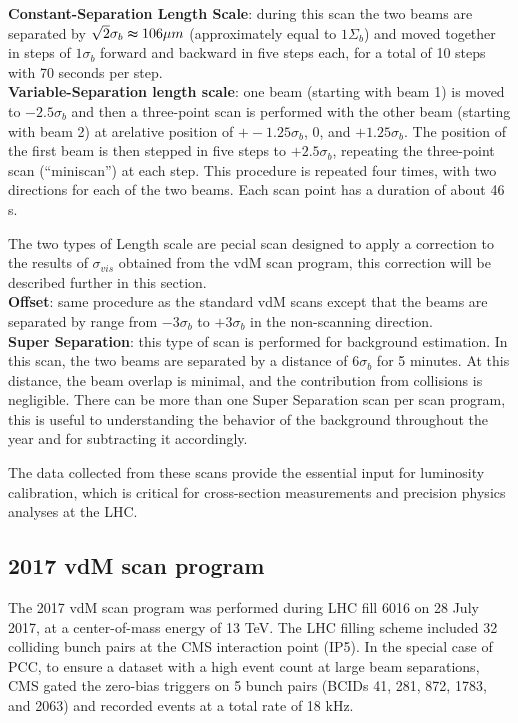 \noindent \textbf{Constant-Separation Length Scale}: during this scan the two beams are separated by $\sqrt{2} \sigma_{b} \thickapprox 106 \mu m$ (approximately equal to $1 \Sigma_{b}$) and moved together in steps of $1\sigma_{b}$ forward and backward in five steps each, for a total of 10 steps with 70 seconds per step.\\

\noindent \textbf{Variable-Separation length scale}: one beam (starting with beam 1) is moved to $-2.5\sigma_{b}$ and then a three-point scan is performed with the other beam (starting with beam 2) at arelative position of $+-1.25\sigma_{b}$, 0, and $+1.25\sigma_{b}$. The position of the first beam is then stepped in five steps to $+2.5\sigma_{b}$, repeating the three-point scan (“miniscan”) at each step. This procedure is repeated four times, with two directions for each of the two beams. Each scan point has a duration of about 46 s.
 
The two types of Length scale are pecial scan designed to apply a correction to the results of  $\sigma_{vis}$ obtained from the vdM scan program, this correction will be described further in this section.\\
 
\noindent \textbf{Offset}: same procedure as the standard vdM scans except that the beams are separated by  range from $-3\sigma_{b}$ to $+3\sigma_{b}$ in the non-scanning direction.\\ 
 
\noindent \textbf{Super Separation}: this type of scan is performed for background estimation. In this scan, the two beams are separated by a distance of \(6\sigma_{b}\) for 5 minutes. At this distance, the beam overlap is minimal, and the contribution from collisions is negligible.  
There can be more than one Super Separation scan per scan program, this is useful to understanding the behavior of the background throughout the year and for subtracting it accordingly.

The data collected from these scans provide the essential input for luminosity calibration, which is critical for cross-section measurements and precision physics analyses at the LHC.
 
\subsection{2017 vdM scan program}
\label{2017 vdM scan program}

The 2017 vdM scan program was performed during LHC fill 6016 on 28 July 2017, at a center-of-mass energy of 13 TeV. The LHC filling scheme included 32 colliding bunch pairs at the CMS interaction point (IP5). In the special case of PCC, to ensure a dataset with a high event count at large beam separations, CMS gated the zero-bias triggers on 5 bunch pairs (BCIDs 41, 281, 872, 1783, and 2063) and recorded events at a total rate of 18 kHz.  


